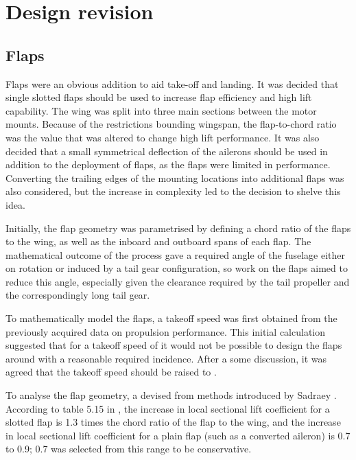 \documentclass[../../main.tex]{subfiles}
\begin{document}
\section{Design revision} \label{sec:design-process:design-revision}

\subsection{Flaps} \label{sec:design-process:design-revision:flaps}


Flaps were an obvious addition to aid take-off and landing.
It was decided that single slotted flaps should be used to increase flap efficiency and high lift capability.
The wing was split into three main sections between the motor mounts.
Because of the restrictions bounding wingspan, the flap-to-chord ratio was the value that was altered to change high lift performance.
It was also decided that a small symmetrical deflection of the ailerons should be used in addition to the deployment of flaps, as the flaps were limited in performance.
Converting the trailing edges of the mounting locations into additional flaps was also considered, but the increase in complexity led to the decision to shelve this idea. 

Initially, the flap geometry was parametrised by defining a chord ratio of the flaps to the wing, as well as the inboard and outboard spans of each flap.
The mathematical outcome of the process gave a required angle of the fuselage either on rotation or induced by a tail gear configuration, so work on the flaps aimed to reduce this angle, especially given the clearance required by the tail propeller and the correspondingly long tail gear. 

To mathematically model the flaps, a takeoff speed was first obtained from the previously acquired data on propulsion performance.
This initial calculation suggested that for a takeoff speed of  it would not be possible to design the flaps around with a reasonable required incidence.
After a some discussion, it was agreed that the takeoff speed should be raised to . 

To analyse the flap geometry, a devised from methods introduced by Sadraey \cite{sadraey-13}.
According to table 5.15 in \cite{sadraey-13}, the increase in local sectional lift coefficient for a slotted flap is 1.3 times the chord ratio of the flap to the wing, and the increase in local sectional lift coefficient for a plain flap (such as a converted aileron) is 0.7 to 0.9; 0.7 was selected from this range to be conservative. 
\end{document}
